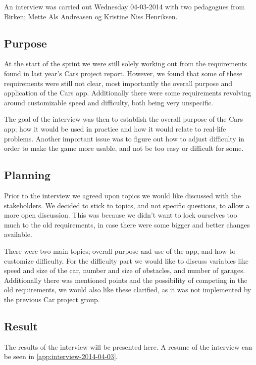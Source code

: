 An interview was carried out Wednesday 04-03-2014 with two pedagogues from Birken; Mette Als Andreasen og Kristine Niss Henriksen.

\subsection{Purpose}
At the start of the sprint we were still solely working out from the requirements found in last year's Cars project report.
However, we found that some of these requirements were still not clear, most importantly the overall purpose and application of the Cars app.
Additionally there were some requirements revolving around customizable speed and difficulty, both being very unspecific.

The goal of the interview was then to establish the overall purpose of the Cars app; how it would be used in practice and how it would relate to real-life problems.
Another important issue was to figure out how to adjust difficulty in order to make the game more usable, and not be too easy or difficult for some.

\subsection{Planning}
Prior to the interview we agreed upon topics we would like discussed with the stakeholders.
We decided to stick to topics, and not specific questions, to allow a more open discussion.
This was because we didn't want to lock ourselves too much to the old requirements, in case there were some bigger and better changes available.

There were two main topics; overall purpose and use of the app, and how to customize difficulty.
For the difficulty part we would like to discuss variables like speed and size of the car, number and size of obstacles, and number of garages.
Additionally there was mentioned points and the possibility of competing in the old requirements, we would also like these clarified, as it was not implemented by the previous Car project group.

\subsection{Result}
The results of the interview will be presented here.
A resume of the interview can be seen in \ref{app:interview-2014-04-03}.

